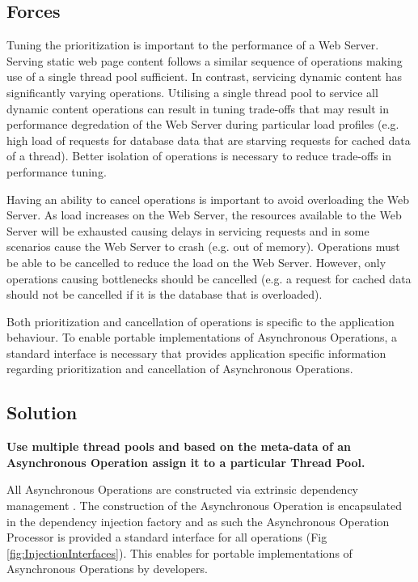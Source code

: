 \documentclass[prodmode]{style/acmlarge}
\begin{document}
\subsection{Forces}

Tuning the prioritization is important to the performance of a Web Server.
Serving static web page content follows a similar sequence of operations making
use of a single thread pool sufficient.  In contrast, servicing dynamic content
has significantly varying operations.  Utilising a single thread pool to service
all dynamic content operations can result in tuning trade-offs that may result
in performance degredation of the Web Server during particular load profiles
(e.g. high load of requests for database data that are starving requests for
cached data of a thread).  Better isolation of operations is necessary to reduce
trade-offs in performance tuning.

Having an ability to cancel operations is important to avoid overloading the Web
Server.  As load increases on the Web Server, the resources available to the Web
Server will be exhausted causing delays in servicing requests and in some
scenarios cause the Web Server to crash (e.g. out of memory).  Operations must
be able to be cancelled to reduce the load on the Web Server.  However, only
operations causing bottlenecks should be cancelled (e.g. a request for cached
data should not be cancelled if it is the database that is overloaded).

Both prioritization and cancellation of operations is specific to the
application behaviour.  To enable portable implementations of Asynchronous
Operations, a standard interface is necessary that provides application specific
information regarding prioritization and cancellation of Asynchronous
Operations.


\subsection{Solution}

\textbf{Use multiple thread pools and based on the meta-data of an Asynchronous Operation assign it to a particular Thread Pool.}

All Asynchronous Operations are constructed via extrinsic dependency management
\cite{ioc}.  The construction of the Asynchronous Operation is encapsulated in
the dependency injection factory and as such the Asynchronous Operation
Processor is provided a standard interface for all operations (Fig
\ref{fig:InjectionInterfaces}).  This enables for portable implementations of
Asynchronous Operations by developers.
\end{document}
